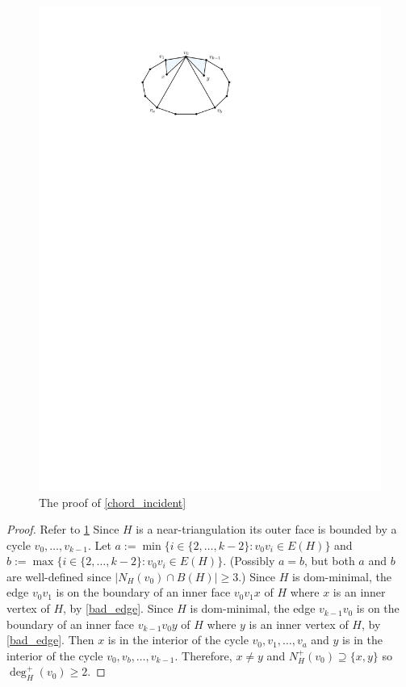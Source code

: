 \documentclass{article}
\theoremstyle{definition}
\begin{document}
\begin{figure}[htbp]
  \centering
  \includegraphics{figs/chord_incident}
  \caption{The proof of \cref{chord_incident}}
  \label{chord_incident_fig}
\end{figure}
\begin{proof}
  Refer to \cref{chord_incident_fig}
  Since $H$ is a near-triangulation its outer face is bounded by a cycle $v_0,\ldots,v_{k-1}$.  Let $a:=\min\{i\in\{2,\ldots,k-2\}:v_0v_i\in E(H)\}$ and $b:=\max\{i\in\{2,\ldots,k-2\}:v_0v_i\in E(H)\}$. (Possibly $a=b$, but both $a$ and $b$ are well-defined since $|N_H(v_0)\cap B(H)|\ge 3$.)   Since $H$ is dom-minimal, the edge $v_0v_1$ is on the boundary of an inner face $v_0v_1x$ of $H$ where $x$ is an inner vertex of $H$, by \cref{bad_edge}.  Since $H$ is dom-minimal, the edge $v_{k-1}v_0$ is on the boundary of an inner face $v_{k-1}v_0y$ of $H$ where $y$ is an inner vertex of $H$, by \cref{bad_edge}.  Then $x$ is in the interior of the cycle $v_0,v_1,\ldots,v_a$ and $y$ is in the interior of the cycle $v_0,v_b,\ldots,v_{k-1}$.  Therefore, $x\neq y$ and $N^+_H(v_0)\supseteq\{x,y\}$ so $\deg^+_H(v_0)\ge 2$.
\end{proof}
\end{document}
